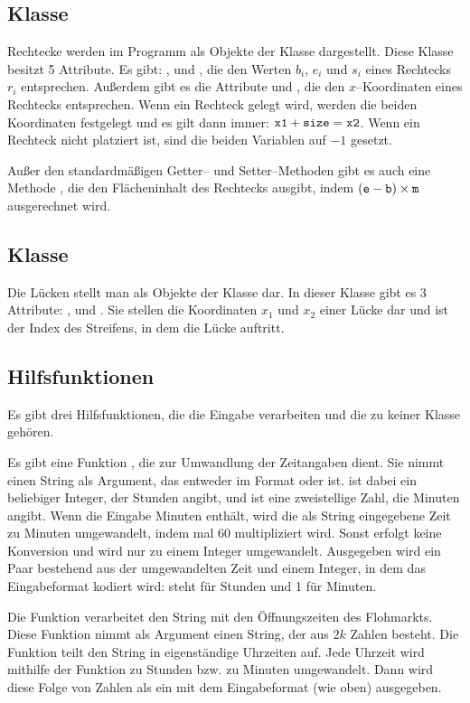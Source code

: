 \subsection{Klasse }
Rechtecke werden im Programm als Objekte der Klasse  dargestellt.
Diese Klasse besitzt 5 Attribute.
Es gibt: ,  und ,
die den Werten $b_i$, $e_i$ und $s_i$ eines Rechtecks $r_i$ entsprechen.
Außerdem gibt es die Attribute  und ,
die den $x$--Koordinaten eines Rechtecks entsprechen.
Wenn ein Rechteck gelegt wird, werden die beiden Koordinaten festgelegt und 
es gilt dann immer: $\texttt{x1} + \texttt{size} = \texttt{x2}$. 
Wenn ein Rechteck nicht platziert ist, sind die beiden Variablen auf $-1$ gesetzt.

Außer den standardmäßigen Getter-- und Setter--Methoden gibt es auch eine Methode
, die den Flächeninhalt des Rechtecks ausgibt, indem $(\texttt{e}-\texttt{b})\times \texttt{m}$
ausgerechnet wird. 

\subsection{Klasse }
Die Lücken stellt man als Objekte der Klasse  dar. 
In dieser Klasse gibt es 3 Attribute: ,  und .
Sie stellen die Koordinaten $x_1$ und $x_2$ einer Lücke dar und
 ist der Index des Streifens, in dem die Lücke auftritt.


\subsection{Hilfsfunktionen}
Es gibt drei Hilfsfunktionen, die die Eingabe verarbeiten und die zu keiner Klasse gehören.

Es gibt eine Funktion , die zur Umwandlung der Zeitangaben dient.
Sie nimmt einen String als Argument, das entweder im Format  oder  ist.
 ist dabei ein beliebiger Integer, der
Stunden angibt, und  ist eine zweistellige Zahl, die Minuten angibt. 
Wenn die Eingabe Minuten enthält, wird die als String eingegebene Zeit zu Minuten umgewandelt,
indem  mal 60 multipliziert wird. Sonst erfolgt keine Konversion und  wird nur 
zu einem Integer umgewandelt.
Ausgegeben wird ein Paar bestehend aus der umgewandelten Zeit und einem Integer, in dem 
das Eingabeformat kodiert wird: steht für Stunden und 1 für Minuten.

Die Funktion  verarbeitet den String mit den Öffnungszeiten 
des Flohmarkts.
Diese Funktion nimmt als Argument einen String, der aus $2k$ Zahlen besteht.
Die Funktion teilt den String in eigenständige Uhrzeiten auf.
Jede Uhrzeit wird mithilfe der Funktion  zu Stunden bzw. zu Minuten umgewandelt.
Dann wird diese Folge von Zahlen als ein  mit dem Eingabeformat (wie oben) ausgegeben.


